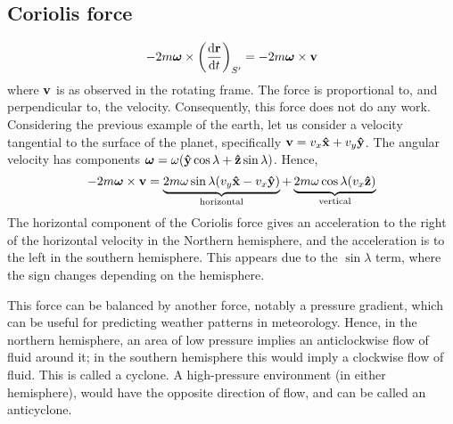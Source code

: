 \subsection{Coriolis force}
\[
	-2 m\bm\omega \times \left( \dv{\vb r}{t} \right)_{S'} = -2m\bm\omega \times \vb v
\]
where \(\vb v\) is as observed in the rotating frame.
The force is proportional to, and perpendicular to, the velocity.
Consequently, this force does not do any work.
Considering the previous example of the earth, let us consider a velocity tangential to the surface of the planet, specifically \(\vb v = v_x \vu x + v_y \vu y\).
The angular velocity has components \(\bm \omega = \omega(\vu y \cos\lambda + \vu z \sin\lambda)\).
Hence,
\[
	-2m\bm\omega \times \vb v = \underbrace{2m\omega\sin\lambda(v_y \vu x - v_x \vu y)}_{\text{horizontal}} + \underbrace{2m\omega\cos\lambda(v_x \vu z)}_{\text{vertical}}
\]
The horizontal component of the Coriolis force gives an acceleration to the right of the horizontal velocity in the Northern hemisphere, and the acceleration is to the left in the southern hemisphere.
This appears due to the \(\sin\lambda\) term, where the sign changes depending on the hemisphere.

This force can be balanced by another force, notably a pressure gradient, which can be useful for predicting weather patterns in meteorology.
Hence, in the northern hemisphere, an area of low pressure implies an anticlockwise flow of fluid around it; in the southern hemisphere this would imply a clockwise flow of fluid.
This is called a cyclone.
A high-pressure environment (in either hemisphere), would have the opposite direction of flow, and can be called an anticyclone.

